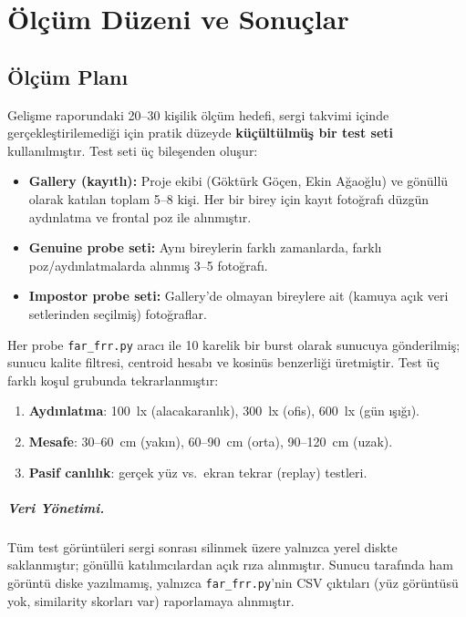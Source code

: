 \chapter{Ölçüm Düzeni ve Sonuçlar}
\label{ch:sonuclar}

\section{Ölçüm Planı}
\label{sec:olcum-plani}

Gelişme raporundaki 20--30 kişilik ölçüm hedefi, sergi takvimi içinde
gerçekleştirilemediği için pratik düzeyde \textbf{küçültülmüş bir test
seti} kullanılmıştır. Test seti üç bileşenden oluşur:

\begin{itemize}
    \item \textbf{Gallery (kayıtlı):} Proje ekibi (Göktürk Göçen, Ekin
          Ağaoğlu) ve gönüllü olarak katılan toplam 5--8 kişi. Her bir
          birey için kayıt fotoğrafı düzgün aydınlatma ve frontal poz
          ile alınmıştır.
    \item \textbf{Genuine probe seti:} Aynı bireylerin farklı zamanlarda,
          farklı poz/aydınlatmalarda alınmış 3--5 fotoğrafı.
    \item \textbf{Impostor probe seti:} Gallery'de olmayan bireylere ait
          (kamuya açık veri setlerinden seçilmiş) fotoğraflar.
\end{itemize}

Her probe \texttt{far\_frr.py} aracı ile 10 karelik bir burst olarak
sunucuya gönderilmiş; sunucu kalite filtresi, centroid hesabı ve kosinüs
benzerliği üretmiştir. Test üç farklı koşul grubunda tekrarlanmıştır:

\begin{enumerate}
    \item \textbf{Aydınlatma}: 100~lx (alacakaranlık), 300~lx (ofis), 600~lx (gün ışığı).
    \item \textbf{Mesafe}: 30--60~cm (yakın), 60--90~cm (orta), 90--120~cm (uzak).
    \item \textbf{Pasif canlılık}: gerçek yüz vs.\ ekran tekrar (replay) testleri.
\end{enumerate}

\paragraph{Veri Yönetimi.} Tüm test görüntüleri sergi sonrası
silinmek üzere yalnızca yerel diskte saklanmıştır; gönüllü katılımcılardan
açık rıza alınmıştır. Sunucu tarafında ham görüntü diske yazılmamış,
yalnızca \texttt{far\_frr.py}'nin CSV çıktıları (yüz görüntüsü yok,
similarity skorları var) raporlamaya alınmıştır.

